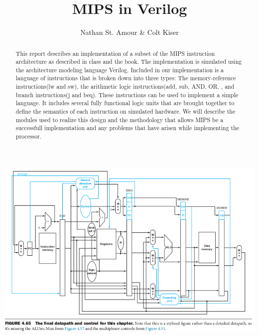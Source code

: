 \documentclass{llncs}
\begin{document}
\raggedbottom

\title{MIPS in Verilog}
\author{Nathan St. Amour \& Colt Kiser}

\maketitle

\begin{abstract}
  This report describes an implementation of a subset of the MIPS instruction architecture as described in class and the book\cite{1}.
  The implementation is simulated using the architecture modeling language Verilog. Included in our implementation is a language of instructions
  that is broken down into three types: The memory-reference instructions(lw and sw), the arithmetic logic instructions(add, sub, AND, OR,
  , and branch instructions(j and beq).  These instructions can be used to implement
  a simple language.  It includes several fully functional logic units that are brought together to define the semantics of each instruction
  on simulated hardware. We will describe the modules used to realize this design and the methodology that allows MIPS be a successfull
  implementation and any problems that have arisen while implementing the processor. 
\end{abstract}

\begin{addmargin}[-5em]{-2em}
  \cite{1}
  \includegraphics[scale=.6]{mips.png}
\end{addmargin}

\tableofcontents  
\newpage
\end{document}

